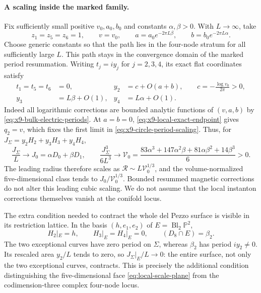 \paragraph{A scaling inside the marked family.}
Fix sufficiently small positive $v_0,a_0,b_0$ and constants
$\alpha,\beta>0$. With $L\to\infty$, take
\begin{equation}
 z_1=z_5=z_6=1,\qquad v=v_0,\qquad
 a=a_0e^{-2\pi L\beta},\qquad b=b_0e^{-2\pi L\alpha}.
 \label{eq:x9-circle-scaling-path}
\end{equation}
Choose generic constants so that the path lies in the four-node
stratum for all sufficiently large $L$. This path stays in the
convergence domain of the marked period resummation. Writing
$t_j=iy_j$ for $j=2,3,4$, its exact flat coordinates satisfy
\begin{equation}
 \begin{aligned}
 t_1=t_5=t_6&=0,&
 y_2&=c+O(a+b),\qquad c=-\frac{\log v_0}{2\pi}>0,\\
 y_3&=L\beta+O(1),&y_4&=L\alpha+O(1).
 \end{aligned}
 \label{eq:x9-circle-period-scaling}
\end{equation}
Indeed all logarithmic corrections are bounded analytic functions
of $(v,a,b)$ by \eqref{eq:x9-bulk-electric-periods}.
At $a=b=0$, \eqref{eq:x9-local-exact-endpoint} gives $q_2=v$,
which fixes the first limit in \eqref{eq:x9-circle-period-scaling}.
Thus, for $J_\Sigma=y_2H_2+y_3H_3+y_4H_4$,
\begin{equation}
 \frac{J_\Sigma}{L}\longrightarrow
 J_0=\alpha D_0+\beta D_1,\qquad
 \frac{J_\Sigma^3}{6L^3}\longrightarrow
 \mathcal V_0=
 \frac{83\alpha^3+147\alpha^2\beta+81\alpha\beta^2+14\beta^3}{6}>0.
 \label{eq:x9-circle-geometric-limit}
\end{equation}
The leading radius therefore scales as
$\mathcal R\sim L\mathcal V_0^{1/3}$, and the volume-normalized
five-dimensional class tends to $J_0/\mathcal V_0^{1/3}$.
Bounded resummed magnetic corrections do not alter this leading
cubic scaling. We do not assume that the local instanton corrections
themselves vanish at the conifold locus.

The extra condition needed to contract the whole del Pezzo surface
is visible in its restriction lattice. In the basis $(h,e_1,e_2)$
of $E=\operatorname{Bl}_2\mathbb P^2$,
\begin{equation}
 H_2|_E=h,\qquad H_3|_E=H_4|_E=0,\qquad
 (D_8\cap E)=\beta_2.
 \label{eq:x9-circle-surface-restriction}
\end{equation}
The two exceptional curves have zero period on $\Sigma$, whereas
$\beta_2$ has period $iy_2\ne0$. Its rescaled area $y_2/L$ tends
to zero, so $J_\Sigma|_E/L\to0$: the entire surface, not only the
two exceptional curves, contracts. This is precisely the additional
condition distinguishing the five-dimensional face
\eqref{eq:local-scale-plane} from the codimension-three complex
four-node locus.

